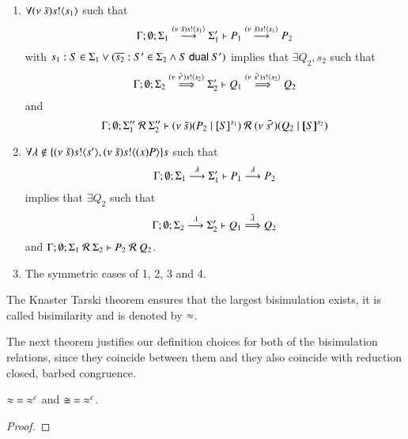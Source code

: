 \begin{definition}[Bisimulation]
\begin{enumerate}
		\item	$\forall (\nu\ \tilde{s}) s ! \langle s_1 \rangle$ such that
			\[
				\Gamma; \emptyset; \Sigma_1 \stackrel{(\nu\ \tilde{s}) s ! \langle s_1 \rangle}{\longrightarrow} \Sigma_1' \vdash P_1 \stackrel{(\nu\ \tilde{s}) s ! \langle s_1 \rangle}{\longrightarrow} P_2
			\]
			with $s_1: S \in \Sigma_1 \vee (\overline{s_2}: S' \in \Sigma_2 \wedge S \ \mathsf{dual}\  S')$
			implies that $\exists Q_2, s_2$ such that
			\[
				\Gamma; \emptyset; \Sigma_2 \stackrel{(\nu\ \tilde{s'}) s ! \langle s_2 \rangle}{\Longrightarrow} \Sigma_2' \vdash Q_1 \stackrel{(\nu\ \tilde{s'}) s ! \langle s_2 \rangle}{\Longrightarrow} Q_2
			\]
			and
			\[
				\Gamma; \emptyset; \Sigma_1''\ \mathcal{R}\ \Sigma_2'' \proves \newsp{\tilde{s}}{P_2 \Par \map{S}^{s_1}}\ \mathcal{R}\ 
				\newsp{\tilde{s'}}{Q_2 \Par \map{S}^{s_2}}
			\]

		\item	$\forall \lambda \notin \{(\nu\ \tilde{s}) s ! \langle s' \rangle, (\nu\ \tilde{s}) s ! \langle (x)P \rangle\}s$ such that
			\[
				\Gamma; \emptyset; \Sigma_1 \stackrel{\lambda}{\longrightarrow} \Sigma_1' \vdash P_1 \stackrel{\lambda}{\longrightarrow} P_2
			\]
			implies that $\exists Q_2$ such that 
			\[
				\Gamma; \emptyset; \Sigma_2 \stackrel{\lambda}{\longrightarrow} \Sigma_2' \vdash Q_1 \stackrel{\hat{\lambda}}{\Longrightarrow} Q_2
			\]
			and
			$\Gamma; \emptyset; \Sigma_1\ \mathcal{R}\ \Sigma_2 \proves P_2\ \mathcal{R}\ Q_2$.

		\item	The symmetric cases of 1, 2, 3 and 4.
	\end{enumerate}
	The Knaster Tarski theorem ensures that the largest bisimulation exists, it is called bisimilarity and is denoted by $\approx$.
\end{definition}

The next theorem justifies our definition choices
for both of the bisimulation relations, since
they coincide between them and they also
coincide with reduction closed, barbed congruence.

\begin{theorem}[Coincidence]\rm
	\label{the:coincidence}
	$\approx\ =\ \approx^{c}$ and $\cong\ =\ \approx^{c}$.
\end{theorem}

\begin{proof}
\end{proof}

